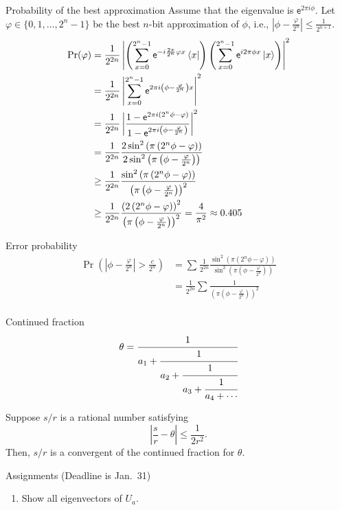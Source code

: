 \documentclass{beamer}
\newcommand\emm[1]{\textcolor{redorange}{{#1}}}
\begin{document}
\begin{frame}{Probability of the best approximation}
\small
Assume that the eigenvalue is $\mathsf{e}^{2\pi i\phi}$.
Let $\varphi\in\{0,1,\dotsc,2^n-1\}$ be the best $n$-bit approximation of $\phi$, i.e., \emm{$|\phi - \frac{\varphi}{2^n}|\le \frac1{2^{n+1}}$}.
\begin{align*}
\Pr(\varphi) &= \frac1{2^{2n}}\left|\left(\sum_{x=0}^{2^n-1} \mathsf{e}^{-i\frac{2\pi}{2^n}\varphi x}\bra{x}\right)\left(\sum_{x=0}^{2^n-1} \mathsf{e}^{i 2\pi\phi x}\ket{x}\right)\right|^2\\
&= \frac1{2^{2n}}\left|\sum_{x=0}^{2^n-1} \mathsf{e}^{2\pi i\left(\phi - \frac{\varphi}{2^n}\right) x}\right|^2\\
&= \frac1{2^{2n}}\left|\frac{1-\mathsf{e}^{2\pi i\left(2^n\phi - \varphi\right)}}{1-\mathsf{e}^{2\pi i\left(\phi - \frac{\varphi}{2^n}\right)}}\right|^2\\
&= \frac1{2^{2n}}\frac{2\sin^2\left(\pi\left(2^n\phi - \varphi\right)\right)}{2\sin^2\left(\pi\left(\phi - \frac{\varphi}{2^n}\right)\right)}\\
&\ge \frac1{2^{2n}}\frac{\sin^2\left(\pi\left(2^n\phi - \varphi\right)\right)}{\left(\pi\left(\phi - \frac{\varphi}{2^n}\right)\right)^2}\\
&\ge \frac1{2^{2n}}\frac{\left(2\left(2^n\phi - \varphi\right)\right)^2}{\left(\pi\left(\phi - \frac{\varphi}{2^n}\right)\right)^2}
= \frac{4}{\pi^2}\approx 0.405
\end{align*}
\end{frame}
\fi

\begin{frame}{Error probability}
\begin{align*}
\Pr\left(\left|\phi - \frac{\varphi}{2^n}\right| > \frac{c}{2^n}\right)
&=\sum_{} \frac1{2^{2n}}\frac{\sin^2\left(\pi\left(2^n\phi - \varphi\right)\right)}{\sin^2\left(\pi\left(\phi - \frac{\varphi}{2^n}\right)\right)}\\
&= \frac1{2^{2n}}\sum_{}\frac{1}{\left(\pi\left(\phi - \frac{\varphi}{2^n}\right)\right)^2}\\
\end{align*}
\end{frame}
\fi

\begin{frame}{Continued fraction}
\begin{equation*}
\theta=\cfrac{1}{a_1+\cfrac{1}{a_2+\cfrac{1}{a_3+\cfrac{1}{a_4+\dotsb}}}}
\end{equation*}
\begin{theorem}
Suppose $s/r$ is a rational number satisfying
\begin{equation*}
\left|\frac{s}{r}-\theta\right|\le\frac1{2r^2}.
\end{equation*}
Then, $s/r$ is a convergent of the continued fraction for $\theta$.
\end{theorem}
\end{frame}


\begin{frame}{Assignments (Deadline is Jan.\ 31)}
\small
\begin{enumerate}
\setlength{\itemsep}{2em}
\item Show all eigenvectors of $U_a$.
\end{enumerate}
\end{frame}
\end{document}
